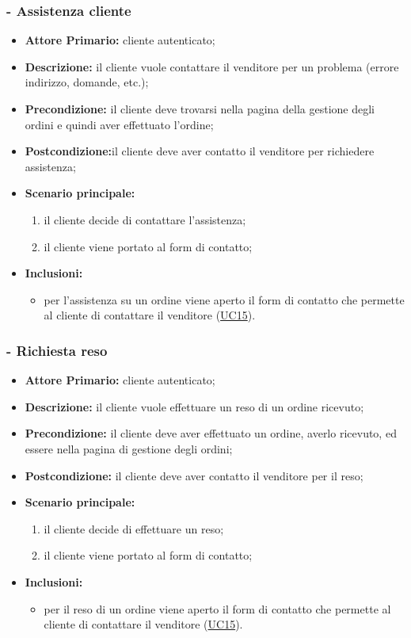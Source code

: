 \stepsubUserCase
\subsubsection{ - Assistenza cliente}
\begin{itemize}
\item \textbf{Attore Primario:} cliente autenticato;
\item \textbf{Descrizione:} il cliente vuole contattare il venditore per un problema (errore indirizzo, domande, etc.);
\item \textbf{Precondizione:} il cliente deve trovarsi nella pagina della gestione degli ordini e quindi aver effettuato l'ordine;
\item \textbf{Postcondizione:}il cliente deve aver contatto il venditore per richiedere assistenza;
\item \textbf{Scenario principale:}
\begin{enumerate}
    \item il cliente decide di contattare l'assistenza;
    \item il cliente viene portato al form di contatto;
\end{enumerate}
\item \textbf{Inclusioni:}
\begin{itemize}
    \item per l'assistenza su un ordine viene aperto il form di contatto che permette al cliente di contattare il venditore (\hyperref[UC15]{UC15}).
\end{itemize}
\end{itemize}

\stepsubUserCase
\subsubsection{ - Richiesta reso}
\begin{itemize}
\item \textbf{Attore Primario:} cliente autenticato;
\item \textbf{Descrizione:} il cliente vuole effettuare un reso di un ordine ricevuto;
\item \textbf{Precondizione:} il cliente deve aver effettuato un ordine, averlo ricevuto, ed essere nella pagina di gestione degli ordini;
\item \textbf{Postcondizione:} il cliente deve aver contatto il venditore per il reso;
\item \textbf{Scenario principale:}
\begin{enumerate}
    \item il cliente decide di effettuare un reso;
    \item il cliente viene portato al form di contatto;
\end{enumerate}
\item \textbf{Inclusioni:}
\begin{itemize}
    \item per il reso di un ordine viene aperto il form di contatto che permette al cliente di contattare il venditore (\hyperref[UC15]{UC15}).
\end{itemize}
\end{itemize}

